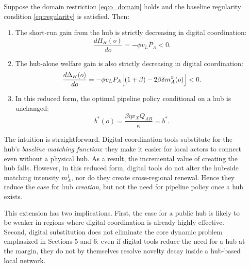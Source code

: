 \begin{proposition}
\label{prop:online_substitution}
Suppose the domain restriction \eqref{eq:o_domain} holds and the baseline regularity condition \eqref{eq:regularity} is satisfied. Then:

\begin{enumerate}[leftmargin=2em]
    \item The short-run gain from the hub is strictly decreasing in digital coordination:
    \begin{equation}
    \frac{d\Pi_H(o)}{do}
    =
    -\phi v_LP_A
    <0.
    \label{eq:dPiH_do}
    \end{equation}

    \item The hub-alone welfare gain is also strictly decreasing in digital coordination:
    \begin{equation}
    \frac{d\Delta_H(o)}{do}
    =
    -\phi v_LP_A\Bigl[(1+\beta)-2\beta\delta m_A^0(o)\Bigr]
    <0.
    \label{eq:dDeltaH_do}
    \end{equation}

    \item In this reduced form, the optimal pipeline policy conditional on a hub is unchanged:
    \begin{equation}
    b^*(o)=\frac{\beta\eta v_XQ_{AB}}{\kappa}=b^*.
    \label{eq:bstar_online}
    \end{equation}
\end{enumerate}
\end{proposition}

The intuition is straightforward. Digital coordination tools substitute for the hub's \emph{baseline matching function}: they make it easier for local actors to connect even without a physical hub. As a result, the incremental value of creating the hub falls. However, in this reduced form, digital tools do not alter the hub-side matching intensity $m_A^1$, nor do they create cross-regional renewal. Hence they reduce the case for hub \emph{creation}, but not the need for pipeline policy once a hub exists.

This extension has two implications. First, the case for a public hub is likely to be weaker in regions where digital coordination is already highly effective. Second, digital substitution does not eliminate the core dynamic problem emphasized in Sections 5 and 6: even if digital tools reduce the need for a hub at the margin, they do not by themselves resolve novelty decay inside a hub-based local network.


